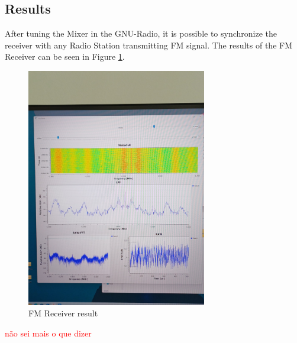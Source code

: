 \subsection{Results}

After tuning the Mixer in the GNU-Radio, it is possible to synchronize the receiver with any Radio Station transmitting FM signal. The results of the FM Receiver can be seen in Figure \ref{fig:RFFE_Result}.

\begin{figure}[H]
    \centering
    \includegraphics*[width=0.7\textwidth]{Images/RFFE_Result.jpeg}
    \caption{FM Receiver result}
    \label{fig:RFFE_Result}
\end{figure}

\textcolor{red}{não sei mais o que dizer}